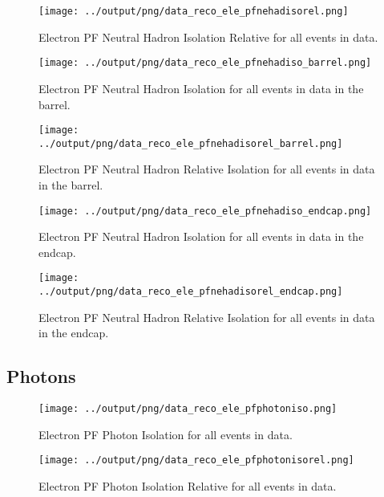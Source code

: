 \documentclass[11pt]{book}
\begin{document}
\begin{figure}[htb]
\centering
\texttt{[image: ../output/png/data\_reco\_ele\_pfnehadisorel.png]}
\caption{Electron PF Neutral Hadron Isolation Relative for all events in data.}
\label{fig:data_ele_pfnehadisorel}
\end{figure}

\begin{figure}[htb]
\centering
\texttt{[image: ../output/png/data\_reco\_ele\_pfnehadiso\_barrel.png]}
\caption{Electron PF Neutral Hadron Isolation for all events in data in the barrel.}
\label{fig:data_ele_pfnehadiso_barrel}
\end{figure}

\begin{figure}[htb]
\centering
\texttt{[image: ../output/png/data\_reco\_ele\_pfnehadisorel\_barrel.png]}
\caption{Electron PF Neutral Hadron Relative Isolation for all events in data in the barrel.}
\label{fig:data_ele_pfnehadisorel_barrel}
\end{figure}

\begin{figure}[htb]
\centering
\texttt{[image: ../output/png/data\_reco\_ele\_pfnehadiso\_endcap.png]}
\caption{Electron PF Neutral Hadron Isolation for all events in data in the endcap.}
\label{fig:data_ele_pfnehadiso_endcap}
\end{figure}

\begin{figure}[htb]
\centering
\texttt{[image: ../output/png/data\_reco\_ele\_pfnehadisorel\_endcap.png]}
\caption{Electron PF Neutral Hadron Relative Isolation for all events in data in the endcap.}
\label{fig:data_ele_pfnehadisorel_endcap}
\end{figure}
\clearpage

\subsection{Photons}
\begin{figure}[htb]
\centering
\texttt{[image: ../output/png/data\_reco\_ele\_pfphotoniso.png]}
\caption{Electron PF Photon Isolation for all events in data.}
\label{fig:data_ele_pfphotoniso}
\end{figure}

\begin{figure}[htb]
\centering
\texttt{[image: ../output/png/data\_reco\_ele\_pfphotonisorel.png]}
\caption{Electron PF Photon Isolation Relative for all events in data.}
\label{fig:data_ele_pfphotonisorel}
\end{figure}
\end{document}
